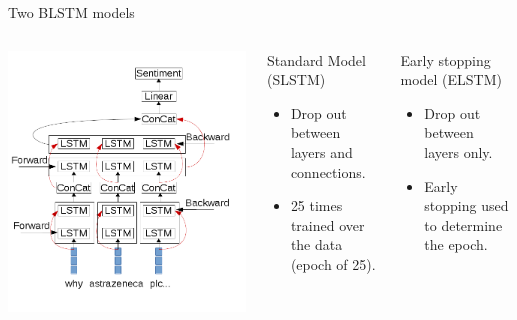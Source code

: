 \documentclass[10pt]{beamer}
\begin{document}
\begin{frame}[fragile]{Two BLSTM models}
\begin{columns}[T,onlytextwidth]
\includegraphics[scale=0.3]{lstm_diagram.png}


      \begin{block}{Standard Model (SLSTM)}
\begin{itemize}
\item Drop out between layers and connections.
\item 25 times trained over the data (epoch of 25).
\end{itemize}

\end{block}
\begin{block}{Early stopping model (ELSTM)}
\begin{itemize}
\item Drop out between layers only.
\item Early stopping used to determine the epoch.
\end{itemize}

\end{block}

  \end{columns}


\end{frame}
\end{document}
